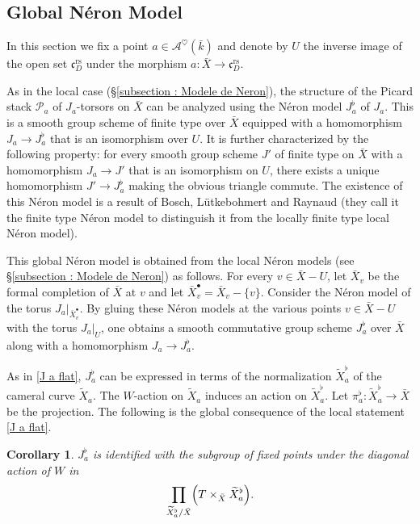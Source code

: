 \documentclass[12pt,english]{smfart}
\numberwithin{equation}{subsection}
\newtheorem{corollary}[equation]{Corollary}
\theoremstyle{remark}
\begin{document}
\subsection{Global N\'eron Model}\label{subsection : Modele de Neron global}

In this section we fix a point $a\in\mathcal{A}^\heartsuit(\bar{k})$ and denote by $U$
the inverse image of the open set $\mathfrak{c}^\mathrm{rs}_D$ under the morphism $a:\bar X\rightarrow \mathfrak{c}^\mathrm{rs}_D$.

As in the local case (\S\ref{subsection : Modele de Neron}), the structure of the Picard stack $\mathcal{P}_a$ of $J_a$-torsors on $\bar{X}$ can be analyzed using the N\'eron model $J_a^\flat$ of $J_a$.
This is a smooth group scheme of finite type over $\bar{X}$ equipped with a homomorphism $J_a\rightarrow J_a^\flat$
that is an isomorphism over $U$. It is further characterized by the following property: for every smooth group scheme $J'$ of finite type on $\bar{X}$ with a homomorphism $J_a\rightarrow J'$ that is an isomorphism on $U$, there exists a unique homomorphism $J'\rightarrow J_a^\flat$ making the obvious triangle commute.
The existence of this N\'eron model is a result of Bosch, L\"utkebohmert and Raynaud \cite{BLR} (they call it the finite type N\'eron model to distinguish it from the locally finite type local N\'eron model).

This global N\'eron model is obtained from the local N\'eron models (see \S\ref{subsection : Modele de Neron}) as follows.
For every $v\in \bar{X}-U$, let $\bar{X}_v$ be the formal completion of $\bar{X}$ at $v$ and let $\bar{X}_v^\bullet=\bar{X}_v-\{v\}$.
Consider the N\'eron model of the torus $J_a|_{\bar{X}_v^\bullet}$. By gluing these N\'eron models at the various points $v\in \bar{X}-U$ with the torus $J_a|_U$, one obtains a smooth commutative group scheme $J_a^\flat$ over $\bar{X}$ along with a homomorphism $J_a\rightarrow J_a^\flat$.

As in \ref{J a flat}, $J_a^\flat$ can be expressed in terms of the normalization $\widetilde X_a^\flat$ of the cameral curve $\widetilde X_a$. The $W$-action on $\widetilde X_a$ induces an action on $\widetilde X_a^\flat$. Let $\pi_a^\flat:\widetilde X_a^\flat\rightarrow \bar X$ be the projection. The following is the global consequence of the local statement \ref{J a flat}.

\begin{corollary}\label{J a flat global}
$J_a^\flat$ is identified with the subgroup of fixed points under the diagonal action of $W$ in
$$
\prod_{\widetilde X_a^\flat/\bar X} \Bigl(T\times_{\bar X}\widetilde X_a^\flat\Bigr).
$$
\end{corollary}
\end{document}
